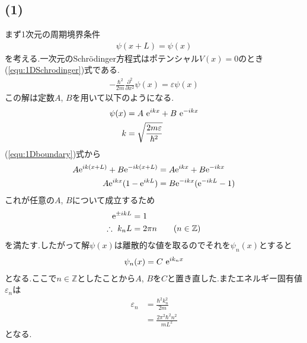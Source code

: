 \subsection*{(1)}
まず1次元の周期境界条件
\begin{align}
  \label{equ:1Dboundary}
  \psi(x+L)=\psi(x)
\end{align}
を考える.一次元のSchr\"{o}dinger方程式はポテンシャル$V(x)=0$のとき(\ref{equ:1DSchrodinger})式である.
\begin{align}
  \label{equ:1DSchrodinger}
  -\frac{\hbar^2}{2m}\frac{\partial^2}{\partial x^2}\psi(x)=\varepsilon\psi(x)
\end{align}
この解は定数$A$, $B$を用いて以下のようになる.
\begin{align}
  \psi(x)&=A\ {\rm e}^{ikx}+B\ {\rm e}^{-ikx}\\
  k&=\sqrt{\frac{2m\varepsilon}{\hbar^2}}
\end{align}
(\ref{equ:1Dboundary})式から
\begin{align}
  A{\rm e}^{ik(x+L)}+B{\rm e}^{-ik(x+L)}&=A{\rm e}^{ikx}+B{\rm e}^{-ikx}\\
  A{\rm e}^{ikx}(1-{\rm e}^{ikL})&=B{\rm e}^{-ikx}({\rm e}^{-ikL}-1)
\end{align}
これが任意の$A$, $B$について成立するため
\begin{align}
  {\rm e}^{\pm ikL}&=1\\
  \therefore\ k_nL&=2\pi n\qquad(n\in\mathbb{Z})
\end{align}
を満たす.したがって解$\psi(x)$は離散的な値を取るのでそれを$\psi_n(x)$とすると
\begin{align}
  \psi_n(x)=C\ {\rm e}^{ik_nx}
\end{align}
となる.ここで$n\in\mathbb{Z}$としたことから$A$, $B$を$C$と置き直した.またエネルギー固有値$\varepsilon_n$は
\begin{align}
  \label{equ:1Deigenvalue}
  \varepsilon_n&=\frac{\hbar^2k_n^2}{2m}\\
  &=\frac{2\pi^2\hbar^2n^2}{mL^2}
\end{align}
となる.

